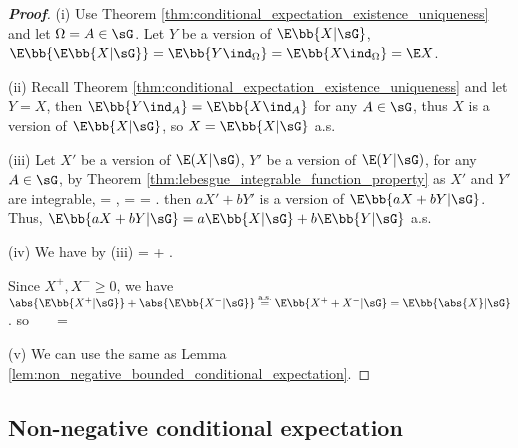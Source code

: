 \begin{proof}[\bf Proof]
\ben
\item [(i)] Use Theorem \ref{thm:conditional_expectation_existence_uniqueness} and let $\Omega = A\in \sG$. Let $Y$ be a version of $\E\bb{X|\sG}$, $\E\bb{\E\bb{X|\sG}} = \E \bb{Y\ind_\Omega} = \E\bb{X\ind_\Omega} = \E X$.

\item [(ii)] Recall Theorem \ref{thm:conditional_expectation_existence_uniqueness} and let $Y = X$, then $\E\bb{Y\ind_A} = \E\bb{X \ind_A}$ for any $A\in \sG$, thus $X$ is a version of $\E\bb{X|\sG}$, so $X = \E\bb{X|\sG}$ a.s.

\item [(iii)] Let $X'$ be a version of $\E(X|\sG)$, $Y'$ be a version of $\E(Y|\sG)$, for any $A\in \sG$, by Theorem \ref{thm:lebesgue_integrable_function_property} as $X'$ and $Y'$ are integrable,
\be
\E{} = \E{}, \quad \E{} = \E{} \quad\ra\quad \E{} = \E{}.
\ee
then $aX' + bY'$ is a version of $\E\bb{aX + bY|\sG}$. Thus, $\E\bb{aX + bY |\sG} = a\E\bb{X |\sG}+ b\E\bb{Y | \sG}$ a.s.

\item [(iv)] We have by (iii) %
\be
{} =    \leq {} + .
\ee

Since $X^+,X^- \geq 0$, we have $\abs{\E \bb{X^+|\sG}} + \abs{\E\bb{X^-|\sG}} \stackrel{\text{a.s.}}{=} \E\bb{X^+ + X^-|\sG} = \E\bb{\abs{X}|\sG}$. so \
\be
{} \leq \E{} \  \quad \ra \quad \E{} \leq \E{} = \E{} \quad {}
\ee

\item [(v)] We can use the same as Lemma \ref{lem:non_negative_bounded_conditional_expectation}.
\een
\end{proof}







\subsection{Non-negative conditional expectation}

